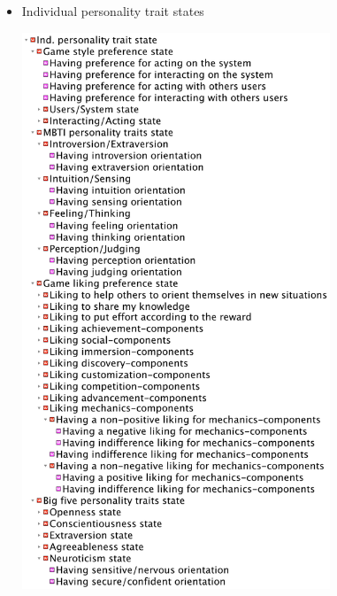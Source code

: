 \begin{itemize}
\item Individual personality trait states

\includegraphics[width=0.725\textwidth]{images/appendix/tree-overview-ind-personality-trait-states.png}


\end{itemize}

